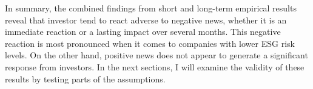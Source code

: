 In summary, the combined findings from short and long-term empirical results reveal that investor tend to react adverse to negative news, whether it is an immediate reaction or a lasting impact over several months. This negative reaction is most pronounced when it comes to companies with lower ESG risk levels. On the other hand, positive news does not appear to generate a significant response from investors. In the next sections, I will examine the validity of these results by testing parts of the assumptions. 